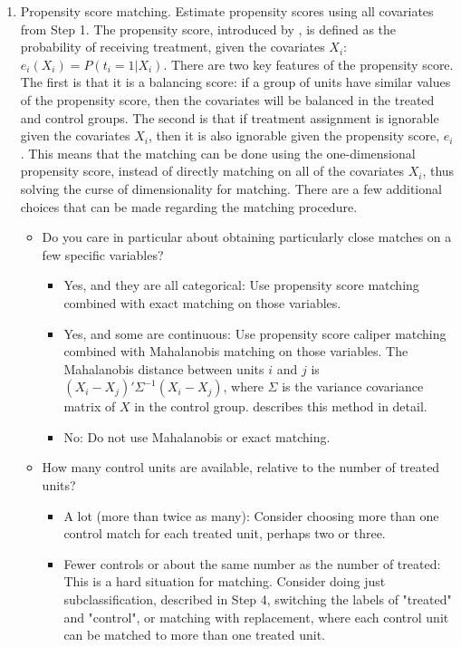 \documentclass[11pt,titlepage]{article}
\begin{document}
\begin{enumerate}
\item Propensity score matching.  Estimate propensity scores using all
  covariates from Step 1.  The propensity score, introduced by
  \cite{RosRub83a}, is defined as the probability of receiving
  treatment, given the covariates $X_i$: $e_i(X_i) = P(t_i=1 | X_i)$.
  There are two key features of the propensity score.  The first is
  that it is a balancing score: if a group of units have similar
  values of the propensity score, then the covariates will be balanced
  in the treated and control groups.  The second is that if treatment
  assignment is ignorable given the covariates $X_i$, then it is also
  ignorable given the propensity score, $e_i$.  This means that the
  matching can be done using the one-dimensional propensity score,
  instead of directly matching on all of the covariates $X_i$, thus
  solving the curse of dimensionality for matching.  There are a few
  additional choices that can be made regarding the matching
  procedure.
\begin{itemize} 
\item Do you care in particular about obtaining particularly close
  matches on a few specific variables?
  \begin{itemize} \item Yes, and they are all categorical: Use propensity
    score matching combined with exact matching on those variables.
  \item Yes, and some are continuous: Use propensity score caliper
    matching combined with Mahalanobis matching on those variables.
    The Mahalanobis distance between units $i$ and $j$ is
    $(X_i-X_j)'\Sigma^{-1}(X_i-X_j)$, where $\Sigma$ is the variance
    covariance matrix of $X$ in the control group.  \cite{RubTho00}
    describes this method in detail.
  \item No: Do not use Mahalanobis or exact matching.
  \end{itemize}
  
\item How many control units are available, relative to the number of
  treated units?
  \begin{itemize} 
  \item A lot (more than twice as many): Consider choosing more than
    one control match for each treated unit, perhaps two or three.
  \item Fewer controls or about the same number as the number of
    treated: This is a hard situation for matching.  Consider doing
    just subclassification, described in Step 4, switching the labels
    of "treated" and "control", or matching with replacement, where
    each control unit can be matched to more than one treated unit.
  \end{itemize}
  

\end{itemize}
\end{enumerate}
\end{document}

